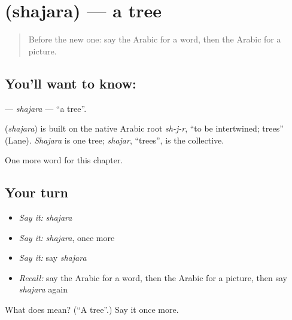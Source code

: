 \section[\texorpdfstring{\ar{شجرة} (shajara)}{شجرة (shajara)}]{ (shajara) — a tree}

\label{lesson:AR-C75-shajara}



\begin{quote}
Before the new one: say the Arabic for a word, then the Arabic for a picture.
\end{quote}

\subsection*{You'll want to know: }
\textbf{} — \emph{shajara} — \textquotedblleft{}a tree\textquotedblright{}.

\begin{cousinweb}
\textbf{} (\emph{shajara}) is built on the native Arabic root \emph{sh-j-r}, \textquotedblleft{}to be intertwined; trees\textquotedblright{} (Lane). \emph{Shajara} is one tree; \emph{shajar}, \textquotedblleft{}trees\textquotedblright{}, is the collective.
\end{cousinweb}

\begin{grammarlens}[title={What you've built}]
One more word for this chapter.
\end{grammarlens}

\subsection*{Your turn}
\begin{itemize}
\raggedright
  \item \emph{Say it:} \emph{shajara}
  \item \emph{Say it:} \emph{shajara}, once more
  \item \emph{Say it:} say \emph{shajara}
  \item \emph{Recall:} say the Arabic for a word, then the Arabic for a picture, then say \emph{shajara} again
\end{itemize}

\begin{tcolorbox}[breakable,colback=teal!4,colframe=teal!35!black,title={Before you move on}]
What does  mean? (\textquotedblleft{}A tree\textquotedblright{}.) Say it once more.
\end{tcolorbox}
